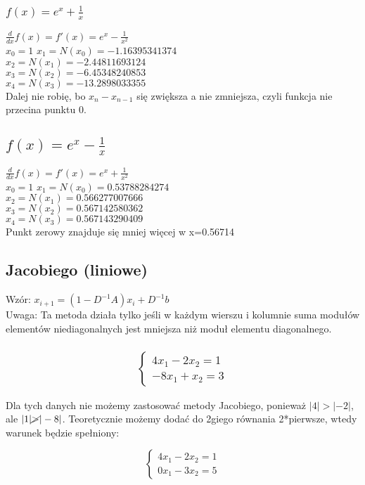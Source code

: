 \documentclass{article}
\begin{document}
\subsubsection{$f(x)=e^x+\frac{1}{x}$}
$\frac{d}{dx}f(x)=f'(x)=e^x-\frac{1}{x^2}$\\
$x_0=1$
$x_1=N(x_0)=-1.16395341374$\\
$x_2=N(x_1)=-2.44811693124$\\
$x_3=N(x_2)=-6.45348240853$\\
$x_4=N(x_3)=-13.2898033355$\\

Dalej nie robię, bo $x_n-x_{n-1}$ się zwiększa a nie zmniejsza, czyli funkcja nie przecina punktu 0.

\subsection{$f(x)=e^x-\frac{1}{x}$}
$\frac{d}{dx}f(x)=f'(x)=e^x+\frac{1}{x^2}$\\
$x_0=1$
$x_1=N(x_0)=0.53788284274$\\
$x_2=N(x_1)=0.566277007666$\\
$x_3=N(x_2)=0.567142580362$\\
$x_4=N(x_3)=0.567143290409$\\

Punkt zerowy znajduje się mniej więcej w x=0.56714

\subsection{Jacobiego (liniowe)}
Wzór: $x_{i+1}=(1-D^{-1}A)x_i+D^{-1}b$\\
Uwaga: Ta metoda działa tylko jeśli w każdym wierszu i kolumnie suma modułów elementów niediagonalnych jest mniejsza niż moduł elementu diagonalnego.
\subsubsection{\begin{equation*}\begin{cases}
    4x_1-2x_2=1\\
    -8x_1+x_2=3
\end{cases}\end{equation*}}
Dla tych danych nie możemy zastosować metody Jacobiego, ponieważ $|4|>|-2|$, ale $|1|\cancel{>}|-8|$. Teoretycznie możemy dodać do 2giego równania 2*pierwsze, wtedy warunek będzie spełniony:

\begin{equation*}\begin{cases}
    4x_1-2x_2=1\\
    0x_1-3x_2=5
\end{cases}\end{equation*}
\end{document}
